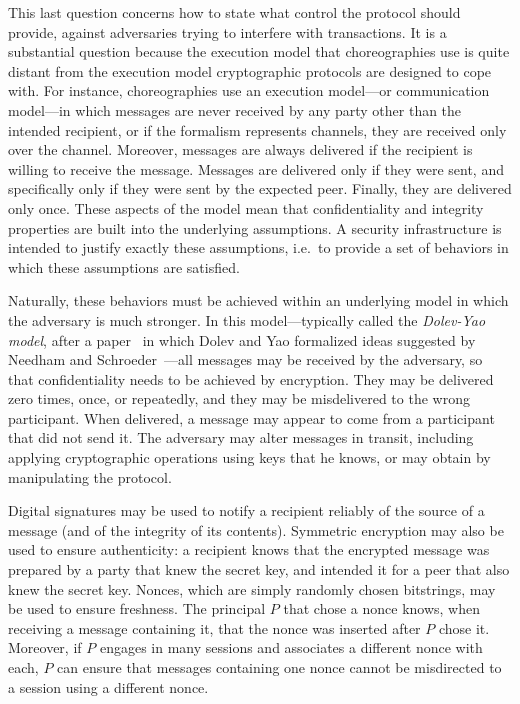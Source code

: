 \documentclass[copyright]{eptcs}
\begin{document}
This last question concerns how to state what control the protocol
should provide, against adversaries trying to interfere with
transactions.  It is a substantial question because the execution
model that choreographies use is quite distant from the execution
model cryptographic protocols are designed to cope with.  For
instance, choreographies use an execution model---or communication
model---in which messages are never received by any party other than
the intended recipient, or if the formalism represents channels, they
are received only over the channel.  Moreover, messages are always
delivered if the recipient is willing to receive the message.
Messages are delivered only if they were sent, and specifically only
if they were sent by the expected peer.  Finally, they are delivered
only once.  These aspects of the model mean that confidentiality and
integrity properties are built into the underlying assumptions.  A
security infrastructure is intended to justify exactly these
assumptions, i.e.~to provide a set of behaviors in which these
assumptions are satisfied.

Naturally, these behaviors must be achieved within an underlying model
in which the adversary is much stronger.  In this model---typically
called the \emph{Dolev-Yao model}, after a paper~\cite{DolevYao83} in
which Dolev and Yao formalized ideas suggested by Needham and
Schroeder~\cite{NeedhamSchroeder78}---all messages may be received by
the adversary, so that confidentiality needs to be achieved by
encryption.  They may be delivered zero times, once, or repeatedly,
and they may be misdelivered to the wrong participant.  When
delivered, a message may appear to come from a participant that did
not send it.  The adversary may alter messages in transit, including
applying cryptographic operations using keys that he knows, or may
obtain by manipulating the protocol.

Digital signatures may be used to notify a recipient reliably of the
source of a message (and of the integrity of its contents).  Symmetric
encryption may also be used to ensure authenticity:  a recipient knows
that the encrypted message was prepared by a party that knew the
secret key, and intended it for a peer that also knew the secret key.
Nonces, which are simply randomly chosen bitstrings, may be used to
ensure freshness.  The principal $P$ that chose a nonce knows, when
receiving a message containing it, that the nonce was inserted after
$P$ chose it.  Moreover, if $P$ engages in many sessions and
associates a different nonce with each, $P$ can ensure that messages
containing one nonce cannot be misdirected to a session using a
different nonce. 
\end{document}
